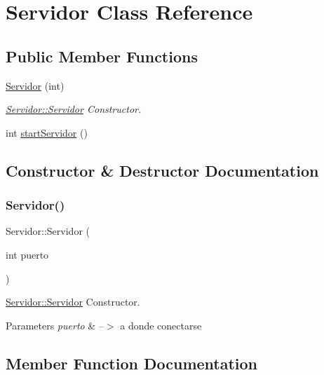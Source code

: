 \hypertarget{classServidor}{}\section{Servidor Class Reference}
\label{classServidor}
\subsection*{Public Member Functions}
\begin{DoxyCompactItemize}
\item 
\mbox{\hyperlink{classServidor_ab62fda340e2085f8269b8e04417a90c9}{Servidor}} (int)
\begin{DoxyCompactList}\small\item\em \mbox{\hyperlink{classServidor_ab62fda340e2085f8269b8e04417a90c9}{Servidor\+::\+Servidor}} Constructor. \end{DoxyCompactList}\item 
int \mbox{\hyperlink{classServidor_a43733f2069b63eb58edcbb61fa6a63ec}{start\+Servidor}} ()
\end{DoxyCompactItemize}


\subsection{Constructor \& Destructor Documentation}
\mbox{\label{classServidor_ab62fda340e2085f8269b8e04417a90c9}} 
\subsubsection{\texorpdfstring{Servidor()}{Servidor()}}
{\footnotesize\ttfamily Servidor\+::\+Servidor (\begin{DoxyParamCaption}\item[{int}]{puerto }\end{DoxyParamCaption})}



\mbox{\hyperlink{classServidor_ab62fda340e2085f8269b8e04417a90c9}{Servidor\+::\+Servidor}} Constructor. 


\begin{DoxyParams}{Parameters}
{\em puerto} & --$>$ a donde conectarse \\
\hline
\end{DoxyParams}


\subsection{Member Function Documentation}
\mbox{\label{classServidor_a43733f2069b63eb58edcbb61fa6a63ec}} 
